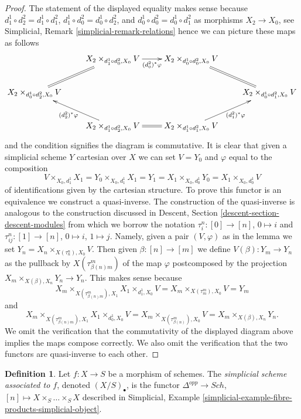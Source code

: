 \documentclass{stacks-project}
\theoremstyle{plain}
\theoremstyle{definition}
\newtheorem{definition}[subsection]{Definition}
\theoremstyle{remark}
\numberwithin{equation}{subsection}
\def\Sch{\mathit{Sch}}
\begin{document}
\begin{proof}
The statement of the displayed equality makes sense because
$d^1_1 \circ d^2_2 = d^1_1 \circ d^2_1$,
$d^1_1 \circ d^2_0 = d^1_0 \circ d^2_2$, and
$d^1_0 \circ d^2_0 = d^1_0 \circ d^2_1$ as morphisms $X_2 \to X_0$, see
Simplicial, Remark \ref{simplicial-remark-relations} hence we
can picture these maps as follows
$$
\xymatrix{
&
X_2 \times_{d^1_1 \circ d^2_0, X_0} V
\ar[r]_-{(d^2_0)^*\varphi} &
X_2 \times_{d^1_0 \circ d^2_0, X_0} V
\ar@{=}[rd] & \\
X_2 \times_{d^1_0 \circ d^2_2, X_0} V
\ar@{=}[ru] & & &
X_2 \times_{d^1_0 \circ d^2_1, X_0} V \\
&
X_2 \times_{d^1_1 \circ d^2_2, X_0} V
\ar[lu]^{(d^2_2)^*\varphi} \ar@{=}[r] &
X_2 \times_{d^1_1 \circ d^2_1, X_0} V
\ar[ru]_{(d^2_1)^*\varphi}
}
$$
and the condition signifies the diagram is commutative. It is clear that
given a simplicial scheme $Y$ cartesian over $X$ we can
set $V = Y_0$ and $\varphi$ equal to the composition
$$
V \times_{X_0, d^1_1} X_1 =
Y_0 \times_{X_0, d^1_1} X_1 = Y_1 =
X_1 \times_{X_0, d^1_0} Y_0 =
X_1 \times_{X_0, d^1_0} V
$$
of identifications given by the cartesian structure. To prove this functor
is an equivalence we construct a quasi-inverse. The construction of
the quasi-inverse is analogous to the construction discussed in
Descent, Section \ref{descent-section-descent-modules} from which we borrow
the notation $\tau^n_i : [0] \to [n]$, $0 \mapsto i$ and
$\tau^n_{ij} : [1] \to [n]$, $0 \mapsto i$, $1 \mapsto j$.
Namely, given a pair $(V, \varphi)$
as in the lemma we set $Y_n = X_n \times_{X(\tau^n_n), X_0} V$.
Then given $\beta : [n] \to [m]$ we define
$V(\beta) : Y_m \to Y_n$ as the pullback by $X(\tau^m_{\beta(n)m})$
of the map $\varphi$ postcomposed by the projection
$X_m \times_{X(\beta), X_n} Y_n \to Y_n$. This makes sense because
$$
X_m \times_{X(\tau^m_{\beta(n)m}), X_1} X_1 \times_{d^1_1, X_0} V
=
X_m \times_{X(\tau^m_m), X_0} V = Y_m
$$
and
$$
X_m \times_{X(\tau^m_{\beta(n)m}), X_1} X_1 \times_{d^1_0, X_0} V =
X_m \times_{X(\tau^m_{\beta(n)}), X_0} V =
X_m \times_{X(\beta), X_n} Y_n.
$$
We omit the verification that the commutativity
of the displayed diagram
above implies the maps compose correctly. We also omit the verification
that the two functors are quasi-inverse to each other.
\end{proof}

\begin{definition}
\label{definition-fibre-products-simplicial-scheme}
Let $f : X \to S$ be a morphism of schemes. The {\it simplicial scheme
associated to $f$}, denoted $(X/S)_\bullet$, is the functor
$\Delta^{opp} \to \Sch$, $[n] \mapsto X \times_S \ldots \times_S X$
described in
Simplicial, Example \ref{simplicial-example-fibre-products-simplicial-object}.
\end{definition}
\end{document}
